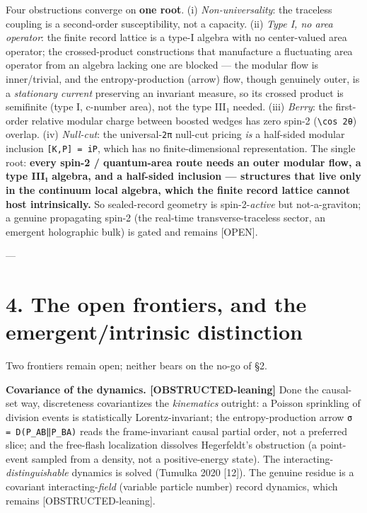 \documentclass[11pt]{article}
\begin{document}
Four obstructions converge on \textbf{one root}. (i) \emph{Non-universality}: the traceless coupling is a second-order susceptibility, not a capacity. (ii) \emph{Type I, no area operator}: the finite record lattice is a type-I algebra with no center-valued area operator; the crossed-product constructions that manufacture a fluctuating area operator from an algebra lacking one are blocked — the modular flow is inner/trivial, and the entropy-production (arrow) flow, though genuinely outer, is a \emph{stationary current} preserving an invariant measure, so its crossed product is semifinite (type I, c-number area), not the type III₁ needed. (iii) \emph{Berry}: the first-order relative modular charge between boosted wedges has zero spin-2 (\texttt{\textbackslash{}cos 2θ}) overlap. (iv) \emph{Null-cut}: the universal-\texttt{2π} null-cut pricing \emph{is} a half-sided modular inclusion \texttt{[K,P] = iP}, which has no finite-dimensional representation. The single root: \textbf{every spin-2 / quantum-area route needs an outer modular flow, a type III₁ algebra, and a half-sided inclusion — structures that live only in the continuum local algebra, which the finite record lattice cannot host intrinsically.} So sealed-record geometry is spin-2-\emph{active} but not-a-graviton; a genuine propagating spin-2 (the real-time transverse-traceless sector, an emergent holographic bulk) is gated and remains [OPEN].

---

\section*{4. The open frontiers, and the emergent/intrinsic distinction}
Two frontiers remain open; neither bears on the no-go of §2.

\textbf{Covariance of the dynamics. [OBSTRUCTED-leaning]} Done the causal-set way, discreteness covariantizes the \emph{kinematics} outright: a Poisson sprinkling of division events is statistically Lorentz-invariant; the entropy-production arrow \texttt{σ = D(P\_AB‖P\_BA)} reads the frame-invariant causal partial order, not a preferred slice; and the free-flash localization dissolves Hegerfeldt's obstruction (a point-event sampled from a density, not a positive-energy state). The interacting-\emph{distinguishable} dynamics is solved (Tumulka 2020 [12]). The genuine residue is a covariant interacting-\emph{field} (variable particle number) record dynamics, which remains [OBSTRUCTED-leaning].
\end{document}
